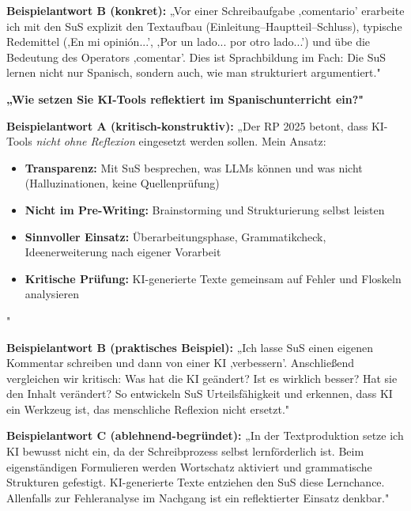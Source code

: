 \documentclass[11pt,a4paper]{article}
\begin{document}
\textbf{Beispielantwort B (konkret):}
„Vor einer Schreibaufgabe ‚comentario' erarbeite ich mit den SuS explizit den Textaufbau (Einleitung--Hauptteil--Schluss), typische Redemittel (‚En mi opinión...', ‚Por un lado... por otro lado...') und übe die Bedeutung des Operators ‚comentar'. Dies ist Sprachbildung im Fach: Die SuS lernen nicht nur Spanisch, sondern auch, wie man strukturiert argumentiert."

\vspace{0.4cm}

\begin{exambox}
\textbf{„Wie setzen Sie KI-Tools reflektiert im Spanischunterricht ein?"}
\end{exambox}

\textbf{Beispielantwort A (kritisch-konstruktiv):}
„Der RP 2025 betont, dass KI-Tools \textit{nicht ohne Reflexion} eingesetzt werden sollen. Mein Ansatz:
\begin{itemize}[leftmargin=0.5cm, itemsep=1pt]
\item \textbf{Transparenz:} Mit SuS besprechen, was LLMs können und was nicht (Halluzinationen, keine Quellenprüfung)
\item \textbf{Nicht im Pre-Writing:} Brainstorming und Strukturierung selbst leisten
\item \textbf{Sinnvoller Einsatz:} Überarbeitungsphase, Grammatikcheck, Ideenerweiterung nach eigener Vorarbeit
\item \textbf{Kritische Prüfung:} KI-generierte Texte gemeinsam auf Fehler und Floskeln analysieren
\end{itemize}"

\textbf{Beispielantwort B (praktisches Beispiel):}
„Ich lasse SuS einen eigenen Kommentar schreiben und dann von einer KI ‚verbessern'. Anschließend vergleichen wir kritisch: Was hat die KI geändert? Ist es wirklich besser? Hat sie den Inhalt verändert? So entwickeln SuS Urteilsfähigkeit und erkennen, dass KI ein Werkzeug ist, das menschliche Reflexion nicht ersetzt."

\textbf{Beispielantwort C (ablehnend-begründet):}
„In der Textproduktion setze ich KI bewusst nicht ein, da der Schreibprozess selbst lernförderlich ist. Beim eigenständigen Formulieren werden Wortschatz aktiviert und grammatische Strukturen gefestigt. KI-generierte Texte entziehen den SuS diese Lernchance. Allenfalls zur Fehleranalyse im Nachgang ist ein reflektierter Einsatz denkbar."

\vspace{0.8cm}
\end{document}
